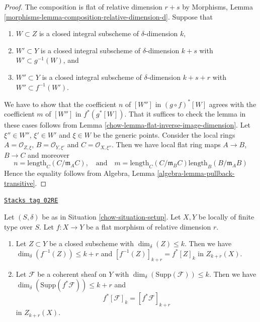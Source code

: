 \begin{proof}

The composition is flat of relative dimension $r + s$ by
Morphisms, Lemma \ref{morphisms-lemma-composition-relative-dimension-d}.
Suppose that
\begin{enumerate}
\item $W \subset Z$ is a closed integral subscheme of $\delta$-dimension $k$,
\item $W' \subset Y$ is a closed integral subscheme of $\delta$-dimension
$k + s$ with $W' \subset g^{-1}(W)$, and
\item $W'' \subset Y$ is a closed integral subscheme of $\delta$-dimension
$k + s + r$ with $W'' \subset f^{-1}(W')$.
\end{enumerate}
We have to show that the coefficient $n$ of $[W'']$ in
$(g \circ f)^*[W]$ agrees with the coefficient $m$ of
$[W'']$ in $f^*(g^*[W])$. That it suffices to check the lemma in these
cases follows from Lemma \ref{chow-lemma-flat-inverse-image-dimension}.
Let $\xi'' \in W''$, $\xi' \in W'$
and $\xi \in W$ be the generic points. Consider the local rings
$A = \mathcal{O}_{Z, \xi}$, $B = \mathcal{O}_{Y, \xi'}$
and $C = \mathcal{O}_{X, \xi''}$. Then we have local flat ring maps
$A \to B$, $B \to C$ and moreover
$$
n = \text{length}_C(C/\mathfrak m_AC),
\quad
\text{and}
\quad
m = \text{length}_C(C/\mathfrak m_BC) \text{length}_B(B/\mathfrak m_AB)
$$
Hence the equality follows from
Algebra, Lemma \ref{algebra-lemma-pullback-transitive}.
\end{proof}

\begin{lemma}
\label{chow-lemma-pullback-coherent}
\href{https://stacks.math.columbia.edu/tag/02RE}{\texttt{Stacks tag 02RE}}

Let $(S, \delta)$ be as in Situation \ref{chow-situation-setup}.
Let $X, Y$ be locally of finite type over $S$.
Let $f : X \to Y$ be a flat morphism of relative dimension $r$.
\begin{enumerate}
\item Let $Z \subset Y$ be a closed subscheme with
$\dim_\delta(Z) \leq k$. Then we have
$\dim_\delta(f^{-1}(Z)) \leq k + r$
and $[f^{-1}(Z)]_{k + r} = f^*[Z]_k$ in $Z_{k + r}(X)$.
\item Let $\mathcal{F}$ be a coherent sheaf on $Y$ with
$\dim_\delta(\text{Supp}(\mathcal{F})) \leq k$.
Then we have $\dim_\delta(\text{Supp}(f^*\mathcal{F})) \leq k + r$
and
$$
f^*[{\mathcal F}]_k = [f^*{\mathcal F}]_{k+r}
$$
in $Z_{k + r}(X)$.
\end{enumerate}
\end{lemma}

